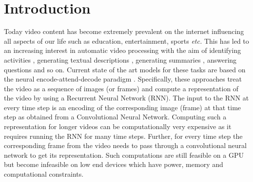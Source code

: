 \documentclass[10pt,twocolumn,letterpaper]{article}
\begin{document}
\section{Introduction}
Today video content has become extremely prevalent on the internet influencing all aspects of our life such as education, entertainment, sports \textit{etc.} This has led to an increasing interest in automatic video processing with the aim of identifying activities \cite{action-recog, video_beyond_short_snippet_classify}, generating textual descriptions \cite{lstm-description}, generating summaries \cite{video_summ}, answering questions \cite{tgif-qa} and so on. Current state of the art models for these tasks are based on the neural encode-attend-decode paradigm \cite{Bahdanau2,Bahdanau}. Specifically, these approaches treat the video as a sequence of images (or frames) and compute a representation of the video by using a Recurrent Neural Network (RNN). The input to the RNN at every time step is an encoding of the corresponding image (frame) at that time step as obtained from a Convolutional Neural Network. Computing such a representation for longer videos can be computationally very expensive as it requires running the RNN for many time steps. Further, for every time step the corresponding frame from the video needs to pass through a convolutional neural network to get its representation. Such computations are still feasible on a GPU but become infeasible on low end devices which have power, memory and computational constraints. 
\end{document}
